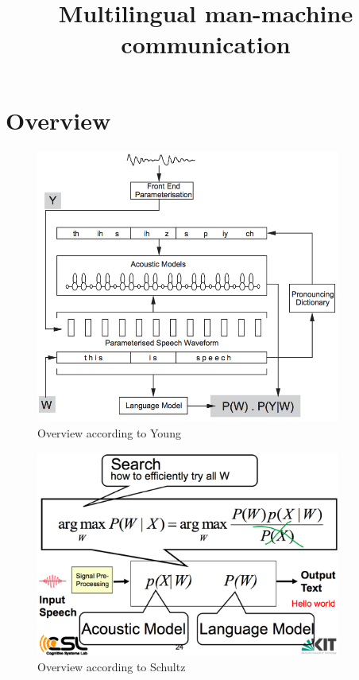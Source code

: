 \documentclass[11pt]{article}
\title{Multilingual man-machine communication}
\date{}
\begin{document}
\setlength{\parindent}{0cm}

\maketitle
\newpage

\tableofcontents
\newpage

\section{Overview}

\begin{figure}[ht]
\centering
\includegraphics[width=10cm]{images/OverviewYoung.png}
\caption{Overview according to Young}
\label{fig:overviewYoung}
\end{figure}

\begin{figure}[ht]
\centering
\includegraphics[width=10cm]{images/OverviewSchultz.png}
\caption{Overview according to Schultz}
\label{fig:overviewSchultz}
\end{figure}
\end{document}
